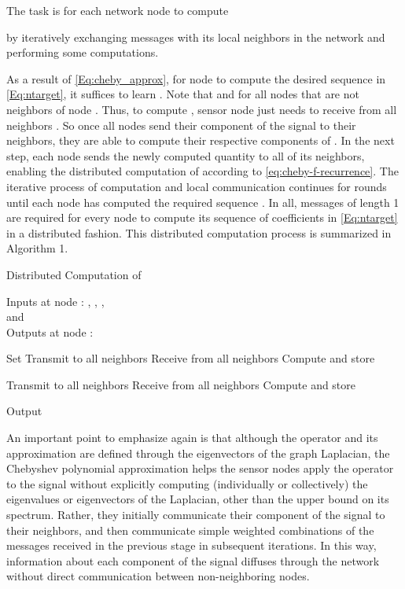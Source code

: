 \documentclass[conference]{IEEEtran}
\begin{document}
The task is for each network node  to compute

by iteratively exchanging messages with its local neighbors in the network and performing some computations.

As a result of \eqref{Eq:cheby_approx}, for node  to compute the desired sequence in \eqref{Eq:ntarget}, it suffices to learn . Note that  and  for all nodes  that are not neighbors of node . Thus, to compute , sensor node  just needs to receive  from all neighbors . So once all nodes send their component of the signal to their neighbors, they are able to compute their respective components of . In the next step, each node  sends the newly computed quantity  to all of its neighbors, enabling the distributed computation of  according to \eqref{eq:cheby-f-recurrence}. The iterative process of computation and local communication continues for  rounds until each node  has computed the required sequence . In all,
 messages of length 1 are required for every node  to compute its sequence of coefficients in \eqref{Eq:ntarget} in a distributed fashion. This distributed computation process is summarized in Algorithm 1. 

\begin{algorithm}[t] \label{alg1}
\caption{Distributed Computation of }
Inputs at node : , , , \\
      and  \\
   Outputs at node :  \\ \begin{algorithmic}[1]
   \STATE Set 
   \STATE Transmit  to all neighbors 
   \STATE Receive  from all neighbors 
   \STATE Compute and store
   
   \FOR{}
   \STATE Transmit  to all neighbors 
    \STATE Receive  from all neighbors 
   \STATE Compute and store
   
   \ENDFOR
   \FOR{}
   \STATE Output
   
   \ENDFOR
   \end{algorithmic}
   \end{algorithm}



An important point to emphasize again is that although the operator  and its approximation  are defined through the eigenvectors of the graph Laplacian, the Chebyshev polynomial approximation helps the sensor nodes apply the operator to the signal without explicitly computing (individually or collectively) the eigenvalues or eigenvectors of the Laplacian, other than the upper bound on its spectrum. Rather, they initially communicate their component of the signal to their neighbors, and then communicate simple weighted combinations of the messages received in the previous stage in subsequent iterations. In this way, information about each component of the signal  diffuses through the network
without direct communication between non-neighboring nodes.
\end{document}
